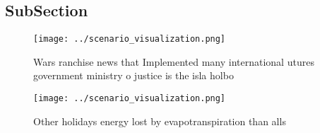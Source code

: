 \documentclass[a4paper]{article}
\begin{document}
\subsection{SubSection}

\begin{figure}
\centering
\texttt{[image: ../scenario\_visualization.png]}
\caption{Wars ranchise news that Implemented many international utures government ministry o justice is the isla holbo
}
\end{figure}
 
\begin{figure}
\centering
\texttt{[image: ../scenario\_visualization.png]}
\caption{Other holidays energy lost by evapotranspiration than alls 
}
\end{figure}
 
\end{document}
